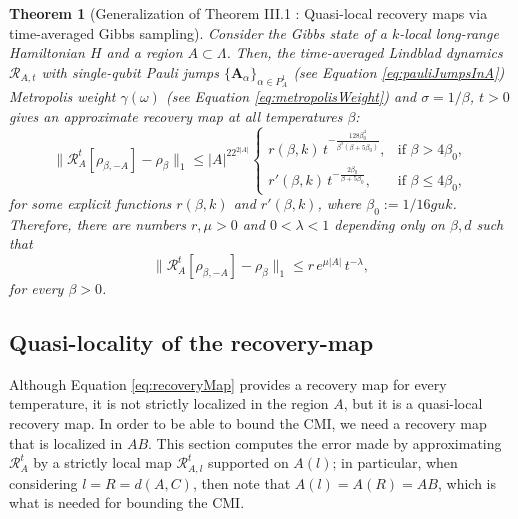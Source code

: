 \documentclass[11pt]{article}
\numberwithin{equation}{section}
\numberwithin{figure}{section}
\numberwithin{table}{section}
\theoremstyle{definition}
\theoremstyle{plain}
\newtheorem{thm}{Theorem}[section]
\theoremstyle{remark}
\newcommand{\RR}{\mathcal{R}}
\newcommand{\vA}{\bm{A}}
\begin{document}
\medskip
\begin{thm}[Generalization of Theorem III.1 \cite{chen_quantum_2025}: Quasi-local recovery maps via time-averaged Gibbs sampling]\label{thm:quasi-Local-RecoveryMap-longRange}
Consider the Gibbs state of a $k$-local long-range Hamiltonian $H$ and a region $A \subset \Lambda$. Then, the time-averaged Lindblad dynamics 
$\mathcal{R}_{A,t}$ with single-qubit Pauli jumps $\{\vA_\alpha\}_{\alpha \in P_A^1}$ (see Equation \eqref{eq:pauliJumpsInA})
Metropolis weight $\gamma(\omega)$ (see Equation \eqref{eq:metropolisWeight}) and $\sigma = 1/\beta$, $t > 0$ gives 
an approximate recovery map at all temperatures $\beta$:
\begin{equation}
    \bigl\| \mathcal{R}^{t}_A[\rho_{\beta,-A}] - \rho_\beta \bigr\|_1
    \le |A|^22^{2|A|}
    \begin{cases}
        r(\beta, k)\, t^{-\frac{128 \beta_0^4}{\beta^3(\beta + 5\beta_0)}}, & \text{if } \beta > 4\beta_0, \\[0.6em]
        r'(\beta, k)\, t^{-\frac{2\beta_0}{\beta + 5\beta_0}}, & \text{if } \beta \le 4\beta_0,
    \end{cases}
\end{equation}
for some explicit functions $r(\beta,k)$ and $r'(\beta,k)$, where $\beta_0 := 1/16guk$. 
Therefore, there are numbers $r, \mu > 0$ and $0 < \lambda < 1$ depending only on $\beta, d$ such that
\begin{equation}
    \bigl\| \mathcal{R}^{t}_A[\rho_{\beta,-A}] - \rho_\beta \bigr\|_1 
    \le r\, e^{\mu |A|}\, t^{-\lambda},
    \label{eq:recoveryMap}
\end{equation}
for every $\beta >0$.
\end{thm}

\subsection{Quasi-locality of the recovery-map}

Although Equation \eqref{eq:recoveryMap} provides a recovery map for every temperature, it is not strictly localized in the region $A$, but it is a quasi-local recovery map. In order to be able to bound the CMI, we need a recovery map that is localized in $AB$. This section computes the error made by approximating $\mathcal{R}_A^t$ by a strictly local map $\RR_{A,l}^t$ supported on $A(l)$; in particular, when considering $l=R=d(A,C)$, then note that $A(l)=A(R)=AB$, which is what is needed for bounding the CMI.
\end{document}
